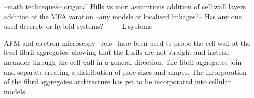 --math techneques--
origonal Hills vs mori assumtions 
addition of cell wall layers
addition of the MFA varation
--any models of localised linkages?--
Has any one used descrete or hybrid systems?---
----L-systems--

AFM and electron microscopy --refs-- have been used to probe the cell wall at the level fibril aggregates, showing that the fibrils are not straight and instead meander through the cell wall in a general direction. The fibril aggregates join and separate creating a distribution of pore sizes and shapes. The incorporation of the fibril aggregates architecture has yet to be incorporated into cellular models. 
